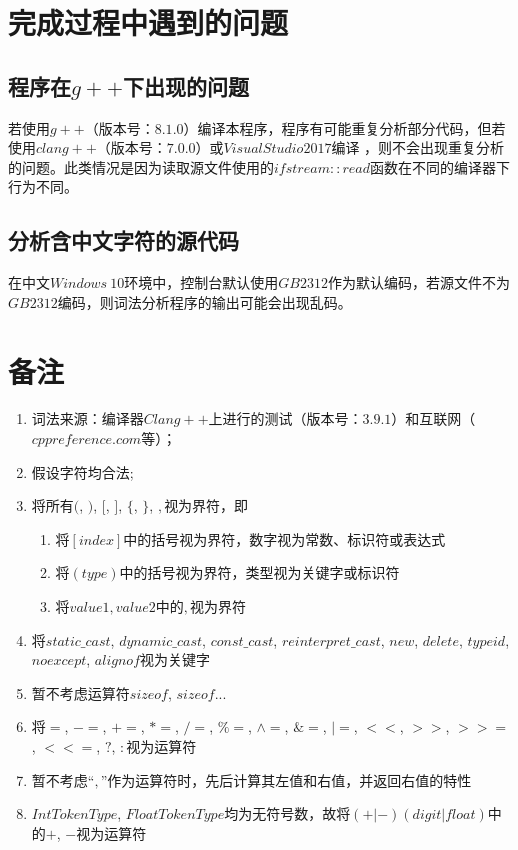 \documentclass[UTF8]{ctexart}
\begin{document}
\section{完成过程中遇到的问题}
\subsection{程序在$g++$下出现的问题}
若使用$g++$（版本号：$8.1.0$）编译本程序，程序有可能重复分析部分代码，但若使用$clang++$（版本号：$7.0.0$）或$Visual Studio 2017$编译
，则不会出现重复分析的问题。此类情况是因为读取源文件使用的$ifstream::read$函数在不同的编译器下行为不同。
\subsection{分析含中文字符的源代码}
在中文$Windows \ 10$环境中，控制台默认使用$GB2312$作为默认编码，若源文件不为$GB2312$编码，则词法分析程序的输出可能会出现乱码。
\section{备注}
\begin{enumerate}
	\item 词法来源：编译器$Clang++$上进行的测试（版本号：$3.9.1$）和互联网（$cppreference.com$等）；
	\item 假设字符均合法;
	\item 将所有$($, $)$, $[$, $]$, $\{$, $\}$, $,$视为界符，即
	      \begin{enumerate}
		      \item 将$[index]$中的括号视为界符，数字视为常数、标识符或表达式
		      \item 将$(type)$中的括号视为界符，类型视为关键字或标识符
		      \item 将${value1, value2}$中的$,$视为界符
	      \end{enumerate}
	\item 将$static\_cast$, $dynamic\_cast$, $const\_cast$, $reinterpret\_cast$, $new$, $delete$, $typeid$, $noexcept$, $alignof$视为关键字
	\item 暂不考虑运算符$sizeof$, $sizeof...$
	\item 将$=$, $-=$, $+=$, $*=$, $/=$, $\%=$, $\wedge=$, $\&=$, $|=$, $<<$, $>>$, $>>=$, $<<=$, $?$, $:$视为运算符
	\item 暂不考虑``$,$''作为运算符时，先后计算其左值和右值，并返回右值的特性
	\item $IntTokenType$, $FloatTokenType$均为无符号数，故将$(+|-)(digit|float)$中的$+$, $-$视为运算符
\end{enumerate}
\end{document}
